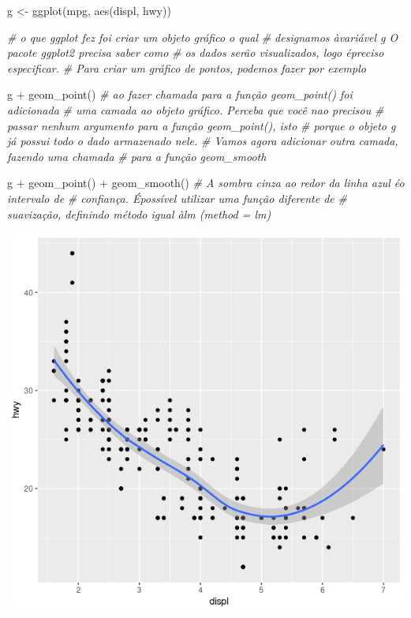 \documentclass[
]{book}
\newenvironment{Shaded}{\begin{snugshade}}{\end{snugshade}}
\newcommand{\CommentTok}[1]{\textcolor[rgb]{0.56,0.35,0.01}{\textit{#1}}}
\newcommand{\FunctionTok}[1]{\textcolor[rgb]{0.00,0.00,0.00}{#1}}
\newcommand{\NormalTok}[1]{#1}
\newcommand{\OtherTok}[1]{\textcolor[rgb]{0.56,0.35,0.01}{#1}}
\newcommand{\SpecialCharTok}[1]{\textcolor[rgb]{0.00,0.00,0.00}{#1}}
\begin{document}
\begin{Shaded}
\begin{Highlighting}[]
\NormalTok{g }\OtherTok{\textless{}{-}} \FunctionTok{ggplot}\NormalTok{(mpg, }\FunctionTok{aes}\NormalTok{(displ, hwy))}

\CommentTok{\# o que ggplot fez foi criar um objeto gráfico o qual}
\CommentTok{\# designamos àvariável g O pacote ggplot2 precisa saber como}
\CommentTok{\# os dados serão visualizados, logo épreciso especificar.}
\CommentTok{\# Para criar um gráfico de pontos, podemos fazer por exemplo}

\NormalTok{g }\SpecialCharTok{+} \FunctionTok{geom\_point}\NormalTok{()}
\CommentTok{\# ao fazer chamada para a função geom\_point() foi adicionada}
\CommentTok{\# uma camada ao objeto gráfico. Perceba que você nao precisou}
\CommentTok{\# passar nenhum argumento para a função geom\_point(), isto}
\CommentTok{\# porque o objeto g já possui todo o dado armazenado nele.}
\CommentTok{\# Vamos agora adicionar outra camada, fazendo uma chamada}
\CommentTok{\# para a função geom\_smooth}

\NormalTok{g }\SpecialCharTok{+} \FunctionTok{geom\_point}\NormalTok{() }\SpecialCharTok{+} \FunctionTok{geom\_smooth}\NormalTok{()}
\CommentTok{\# A sombra cinza ao redor da linha azul éo intervalo de}
\CommentTok{\# confiança. Épossível utilizar uma função diferente de}
\CommentTok{\# suavização, definindo método igual àlm (method = \textquotesingle{}lm\textquotesingle{})}
\end{Highlighting}
\end{Shaded}

\includegraphics{figure/g16.png}
\end{document}
